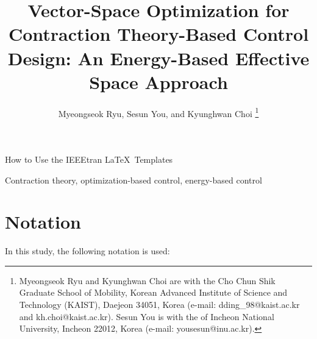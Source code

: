 \documentclass[lettersize,journal]{IEEEtran}
\begin{document}
\title{
  Vector-Space Optimization for Contraction Theory-Based Control Design: An Energy-Based Effective Space Approach
} %

\author{
  Myeongseok Ryu, Sesun You, and Kyunghwan Choi
\thanks{
  Myeongseok Ryu and Kyunghwan Choi are with the Cho Chun Shik Graduate School of Mobility, Korean Advanced Institute of Science and Technology (KAIST), Daejeon 34051, Korea (e-mail: dding\_98@kaist.ac.kr and kh.choi@kaist.ac.kr).
  Sesun You is with the  of Incheon National University, Incheon 22012, Korea (e-mail: yousesun@inu.ac.kr).
  }
}

%
{How to Use the IEEEtran \LaTeX \ Templates}

\maketitle

\begin{abstract}
  \cblue{\lipsum[1]}
\end{abstract}

\begin{IEEEkeywords}
  Contraction theory, 
  optimization-based control,
  energy-based control
\end{IEEEkeywords}

\section*{Notation}
In this study, the following notation is used:
\end{document}
